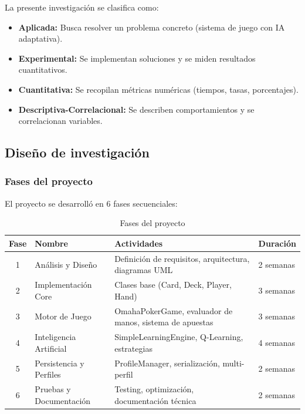 \documentclass[12pt,a4paper]{article}
\begin{document}
La presente investigación se clasifica como:

\begin{itemize}
    \item \textbf{Aplicada:} Busca resolver un problema concreto (sistema de juego con IA adaptativa).
    \item \textbf{Experimental:} Se implementan soluciones y se miden resultados cuantitativos.
    \item \textbf{Cuantitativa:} Se recopilan métricas numéricas (tiempos, tasas, porcentajes).
    \item \textbf{Descriptiva-Correlacional:} Se describen comportamientos y se correlacionan variables.
\end{itemize}

\subsection{Diseño de investigación}

\subsubsection{Fases del proyecto}

El proyecto se desarrolló en 6 fases secuenciales:

\begin{table}[H]
\centering
\caption{Fases del proyecto}
\begin{tabular}{|c|p{4cm}|p{6cm}|p{2cm}|}
\hline
\textbf{Fase} & \textbf{Nombre} & \textbf{Actividades} & \textbf{Duración} \\
\hline
1 & Análisis y Diseño & Definición de requisitos, arquitectura, diagramas UML & 2 semanas \\
\hline
2 & Implementación Core & Clases base (Card, Deck, Player, Hand) & 3 semanas \\
\hline
3 & Motor de Juego & OmahaPokerGame, evaluador de manos, sistema de apuestas & 3 semanas \\
\hline
4 & Inteligencia Artificial & SimpleLearningEngine, Q-Learning, estrategias & 4 semanas \\
\hline
5 & Persistencia y Perfiles & ProfileManager, serialización, multi-perfil & 2 semanas \\
\hline
6 & Pruebas y Documentación & Testing, optimización, documentación técnica & 2 semanas \\
\hline
\end{tabular}
\label{tab:fases}
\end{table}
\end{document}
